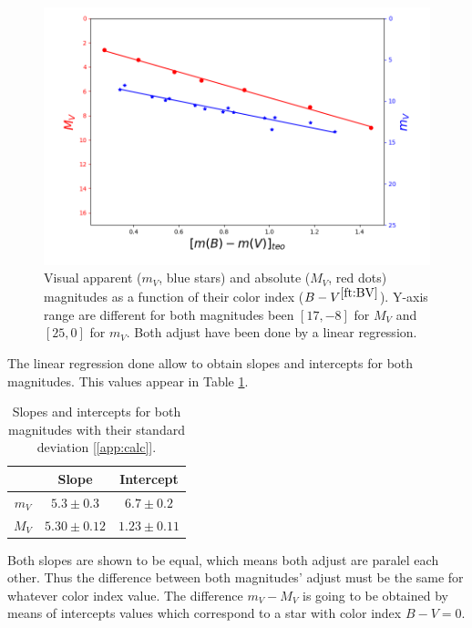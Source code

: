 \documentclass[twoside]{article}
\begin{document}
\begin{multicols}{2}
				\begin{figure}[H]
					\centering
					\includegraphics[scale=0.35]{Figures/both.png}
					\caption{\label{Img:Both}Visual apparent ($m_V$, blue stars) and absolute ($M_V$, red dots) magnitudes as a function of their color index ($B-V^{\ref{ft:BV}}$). Y-axis range are different for both magnitudes been $[17, -8]$ for $M_V$ and $[25, 0]$ for $m_V$. Both adjust have been done by a linear regression.}
				\end{figure}

			The linear regression done allow to obtain slopes and intercepts for both magnitudes. This values appear in Table \ref{Tab:Regression}.

				\begin{table}[H]
					\centering
					\begin{tabular}{c || c c}
						\hline
						\centering
							 & Slope & Intercept  \\ \hline
							$m_V$ & $5.3 \pm 0.3$ & $6.7 \pm 0.2$ \\ 
					        $M_V$ & $5.30 \pm 0.12$ & $1.23 \pm 0.11$ \\ \hline
					\end{tabular}
					\caption{\label{Tab:Regression}Slopes and intercepts for both magnitudes with their standard deviation [\ref{app:calc}].}
				\end{table}

			Both slopes are shown to be equal, which means both adjust are paralel each other. Thus the difference between both magnitudes' adjust must be the same for whatever color index value. The difference $m_V - M_V$ is going to be obtained by means of intercepts values which correspond to a star with color index $B - V = 0$.


\end{multicols}
\end{document}

